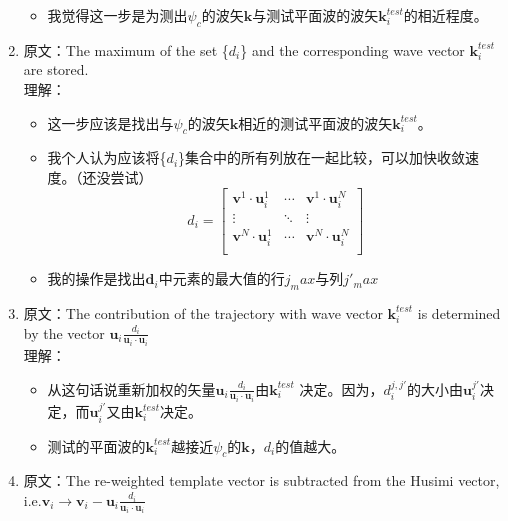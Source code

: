 \documentclass[UTF8]{ctexart}
\begin{document}
\begin{enumerate}
\begin{itemize}
            \item 我觉得这一步是为测出$\psi_c$的波矢$\mathbf{k}$与测试平面波的波矢$\mathbf{k}_i^{test}$的相近程度。
        \end{itemize}
%
\item {\heiti 原文}：The maximum of the set \{$d_i$\} and the corresponding wave vector $\mathbf{k}_{i}^{test}$ are stored.\\
        {\heiti 理解}：
        \begin{itemize}
            \item 这一步应该是找出与$\psi_c$的波矢$\mathbf{k}$相近的测试平面波的波矢$\mathbf{k}_i^{test}$。
            \item 我个人认为应该将\{$d_i$\}集合中的所有列放在一起比较，可以加快收敛速度。（还没尝试）
                $$ d_i=  
                    \begin{bmatrix}
                        \mathbf{v}^{1}\cdot\mathbf{u}_i^{1}&\cdots&\mathbf{v}^{1}\cdot\mathbf{u}_i^{N}\\
                        \vdots & \ddots &\vdots\\
                        \mathbf{v}^{N}\cdot\mathbf{u}_i^{1}&\cdots&\mathbf{v}^{N}\cdot\mathbf{u}_i^{N}\\
                    \end{bmatrix}
                $$
            \item 我的操作是找出$\mathbf{d}_i$中元素的最大值的行${j_max}$与列${j'_max}$
        \end{itemize}
\item {\heiti 原文}：The contribution of the trajectory with wave vector $\mathbf{k}_{i}^{test}$ is determined by 
                    the vector $\mathbf{u}_i\frac{d_i}{\mathbf{u}_i\cdot\mathbf{u}_i}$\\
        {\heiti 理解}：
        \begin{itemize}
            \item 从这句话说重新加权的矢量$\mathbf{u}_i\frac{d_i}{\mathbf{u}_i\cdot\mathbf{u}_i}$由$\mathbf{k}_{i}^{test}$
                    决定。因为，$d_{i}^{j,j'}$的大小由$\mathbf{u}_{i}^{j'}$决定，而$\mathbf{u}_{i}^{j'}$又由$\mathbf{k}_{i}^{test}$决定。
            \item 测试的平面波的$\mathbf{k}_i^{test}$越接近$\psi_c$的$\mathbf{k}$，$d_i$的值越大。
        \end{itemize}
%
\item {\heiti 原文}：The re-weighted template vector is subtracted from the \textcolor{red!80}{Husimi vector}, i.e.$\mathbf{v}_i \rightarrow \mathbf{v}_i - \mathbf{u}_i\frac{d_i}{\mathbf{u}_i\cdot\mathbf{u}_i}$\\

\end{enumerate}
\end{document}
